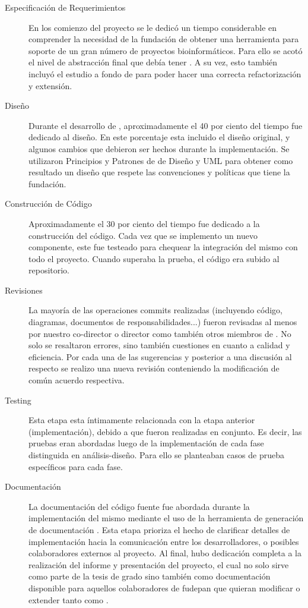 \begin{description}

    \item[Especificación de Requerimientos]
        En los comienzo del proyecto se le dedicó un tiempo considerable en comprender la necesidad de la fundación de obtener una
herramienta para soporte de un gran número de proyectos bioinformáticos. Para ello se acotó el nivel de abstracción final que debía tener
\rc. A su vez, esto también incluyó el estudio a fondo de \fud{} para poder hacer una correcta refactorización y extensión.

    \item[Diseño]
        Durante el desarrollo de \rc{}, aproximadamente el 40 por ciento del tiempo fue dedicado al diseño. En este porcentaje esta
incluido el diseño original, y algunos cambios que debieron ser hechos durante la implementación. Se utilizaron Principios y Patrones de
de Diseño y UML para obtener como resultado un diseño que respete las convenciones y políticas que tiene la fundación.

    \item[Construcción de Código]
Aproximadamente el 30 por ciento del tiempo fue dedicado a la construcción del código. Cada vez que se implemento un nuevo componente,
este fue testeado para chequear la integración del mismo con todo el proyecto. Cuando superaba la prueba, el código era subido al
repositorio.

    \item[Revisiones]
        La mayoría de las operaciones commits realizadas (incluyendo código, diagramas, documentos de responsabilidades...) fueron
revisadas al menos por nuestro co-director o director como también otros miembros de \fude. No solo se resaltaron errores, sino también
cuestiones en cuanto a calidad y eficiencia. Por cada una de las sugerencias y posterior a una discusión al respecto se realizo una nueva
revisión conteniendo la modificación de común acuerdo respectiva.

    \item[Testing]
Esta etapa esta íntimamente relacionada con la etapa anterior (implementación), debido a que fueron realizadas en conjunto. Es decir,
las pruebas eran abordadas luego de la implementación de cada fase distinguida  en análisis-diseño. Para ello se planteaban casos de
prueba específicos para cada fase.

    \item[Documentación]
La documentación del código fuente fue abordada durante la implementación del mismo mediante el uso de la herramienta de generación de
documentación \doxy. Esta etapa prioriza el hecho de clarificar detalles de implementación hacia la comunicación entre los desarrolladores,
o posibles colaboradores externos al proyecto. Al final, hubo dedicación completa a la realización del informe y presentación
del proyecto, el cual no solo sirve como parte de la tesis de grado sino también como documentación disponible para aquellos
colaboradores de fudepan que quieran modificar o extender tanto \rc{} como \fud.


\end{description}
